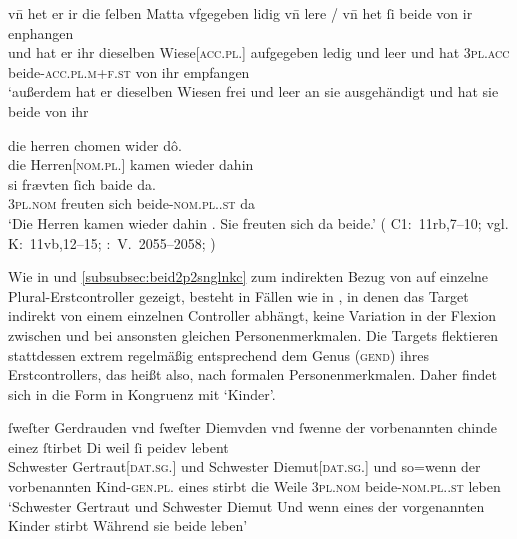 \begin{exe}
\ex \label{ex:pronindir}
	\begin{xlist}
	\ex \label{ex:pronindir_1}
		\gll vn̄ het er ir {die ſelben} Matta vfgegeben lidig vn̄ lere /
			vn̄ het ſi beide von ir enphangen \\
		und hat er ihr dieselben Wiese[\textsc{acc.pl.\FemI}] aufgegeben ledig
			und leer {} und hat \textsc{3pl\subI.acc}
			beide-\textsc{acc.pl.m+f\subI.st} von ihr empfangen \\
		\trans `außerdem hat er dieselben Wiesen frei und leer an sie
			ausgehändigt und hat sie beide von ihr 
			\parencites(Nr.~2733, Freiburg i.\,Br., 1297)[105,23--24]{cao4}

	\ex \label{ex:pronindir_2}
		\gll die herren chomen wider dô. \\
			die Herren[\textsc{nom.pl.\MascM}] kamen wieder dahin \\
			\textelp{}
	\sn \gll si frævten ſich baide da. \\
			\textsc{3pl\subM.nom} freuten sich beide-\textsc{nom.pl.\MascM.st}
			da \\
		\trans `Die Herren kamen wieder dahin \textelp{}. Sie freuten sich da
			beide.'
			(%
				C1:~11rb,7--10; vgl.
				K:~11vb,12--15;
				\KC:~V.~2055--2058;
				\cite[119]{schroeder1895}%
			)
	\end{xlist}
\end{exe}

Wie in  und \ref{subsubsec:beid2p2snglnkc}
zum indirekten Bezug von  auf einzelne Plural-Erstcontroller
gezeigt, besteht in Fällen wie in , in denen das Target
indirekt von einem einzelnen Controller abhängt, keine Variation in der Flexion
zwischen  und  bei ansonsten gleichen
Personenmerkmalen. Die Targets flektieren stattdessen extrem regelmäßig
entsprechend dem Genus (\textsc{gend}) ihres Erstcontrollers, das heißt also,
nach formalen Personenmerkmalen. Daher findet sich in
 die Form
 in Kongruenz mit  `Kinder'.

\begin{exe}
\ex \label{ex:f+f_kindesibeidiu}
	\gll ſweſter Gerdrauden vnd ſweſter Diemvden
			\textelp{} vnd ſwenne der vorbenannten chinde einez ſtirbet
			\textelp{} Di weil ſi peidev lebent \\
		Schwester Gertraut[\textsc{dat.sg.\FemF}] und Schwester
			Diemut[\textsc{dat.sg.\FemF}]
			{} und so=wenn der vorbenannten
			Kind-\textsc{gen.pl.\NeutF} eines stirbt {} die Weile
			\textsc{3pl\subF.nom} beide-\textsc{nom.pl.\NeutF.st} leben \\
	\trans `Schwester Gertraut und Schwester Diemut
		\textelp{} Und wenn eines der vorgenannten Kinder stirbt \textelp{}
		Während sie beide leben'
		\parencites(Nr.~2960, Engelthal, Kr.~Nürnberger Land, 1298)[240,31--38]{cao4}
\end{exe}

